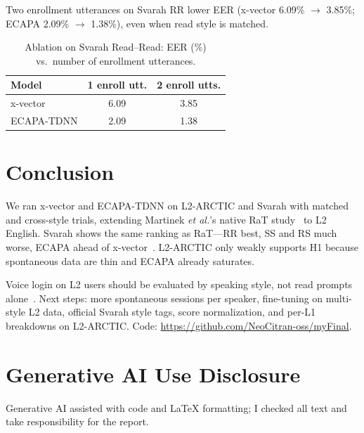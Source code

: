 \documentclass[cameraready]{Interspeech}
\begin{document}
Two enrollment utterances on Svarah RR lower EER (x-vector 6.09\% $\rightarrow$ 3.85\%; ECAPA 2.09\% $\rightarrow$ 1.38\%), even when read style is matched.

\begin{table}[H]
  \caption{Ablation on Svarah Read--Read: EER (\%) vs.\ number of enrollment utterances.}
  \label{tab:ablation}
  \centering
  \begin{tabular}{lcc}
    \toprule
    Model & 1 enroll utt. & 2 enroll utts. \\
    \midrule
    x-vector & 6.09 & 3.85 \\
    ECAPA-TDNN & 2.09 & 1.38 \\
    \bottomrule
  \end{tabular}
\end{table}

\section{Conclusion}
\label{sec:conclusion}

We ran x-vector and ECAPA-TDNN on L2-ARCTIC and Svarah with matched and cross-style trials, extending Martinek \textit{et al.}'s native RaT study~\cite{martinek2025read} to L2 English. Svarah shows the same ranking as RaT---RR best, SS and RS much worse, ECAPA ahead of x-vector~\cite{desplanques2020ecapa}. L2-ARCTIC only weakly supports H1 because spontaneous data are thin and ECAPA already saturates.

Voice login on L2 users should be evaluated by speaking style, not read prompts alone~\cite{javed2023svarah,zhao2018l2arctic}. Next steps: more spontaneous sessions per speaker, fine-tuning on multi-style L2 data, official Svarah style tags, score normalization, and per-L1 breakdowns on L2-ARCTIC. Code: \url{https://github.com/NeoCitran-oss/myFinal}.


\section{Generative AI Use Disclosure}
Generative AI assisted with code and LaTeX formatting; I checked all text and take responsibility for the report.



\end{document}
